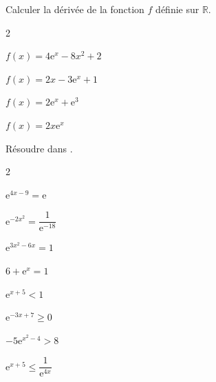 \documentclass[12pt,a4paper]{article}  %
\begin{document}
Calculer la dérivée de la fonction $f$ définie sur $\mathbb{R}$.
\begin{multicols}{2}
	\begin{enumMet}
		\item $f(x)=4 \mathrm{e}^x-8 x^2+2$
		\item {} $f(x)=2x-3 \mathrm{e}^x+1$
		\item $f(x)=2\mathrm{e}^x+\mathrm{e}^3$
		\item $f(x)=2x \mathrm{e}^x$
	\end{enumMet}
\end{multicols}

Résoudre dans \R.
\begin{multicols}{2}
	\begin{enumMet}
		\item $\mathrm{e}^{4x-9}=\mathrm{e}$
		\item $\mathrm{e}^{-2x^2}=\dfrac{1}{\mathrm{e}^{-18}}$
		\item {} $\mathrm{e}^{3x^2-6x}=1$
		\item $6+\mathrm{e}^x=1$
		\item $\mathrm{e}^{x+5}<1$
		\item $\mathrm{e}^{-3 x+7} \geqslant 0$
		\item $-5 \mathrm{e}^{x^2-4}>8$
		\item $\mathrm{e}^{x+5} \leqslant \dfrac{1}{\mathrm{e}^{4 x}}$
	\end{enumMet}
\end{multicols}
\end{document}
